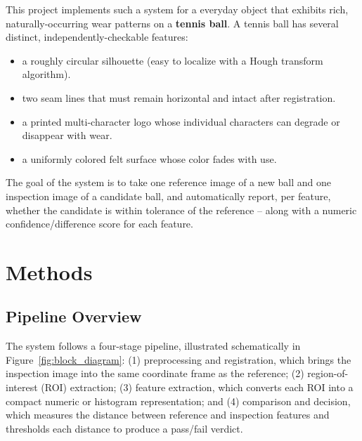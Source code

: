 \documentclass[11pt,a4paper]{article}
\begin{document}
This project implements such a system for a everyday object that exhibits
rich, naturally-occurring wear patterns on a \textbf{tennis ball}. A tennis
ball has several distinct, independently-checkable features:
\begin{itemize}[noitemsep]
    \item a roughly circular silhouette (easy to localize with a Hough
    transform algorithm).
    \item two seam lines that must remain horizontal and intact after
    registration.
    \item a printed multi-character logo whose individual characters can
    degrade or disappear with wear.
    \item a uniformly colored felt surface whose color fades with use.
\end{itemize}

The goal of the system is to take one reference image of a new ball and one
inspection image of a candidate ball, and automatically report, per
feature, whether the candidate is within tolerance of the reference --
along with a numeric confidence/difference score for each feature.

\section{Methods}

\subsection{Pipeline Overview}

The system follows a four-stage pipeline, illustrated schematically in
Figure~\ref{fig:block_diagram}: (1) preprocessing and registration, which
brings the inspection image into the same coordinate frame as the
reference; (2) region-of-interest (ROI) extraction; (3) feature extraction,
which converts each ROI into a compact numeric or histogram representation;
and (4) comparison and decision, which measures the distance between
reference and inspection features and thresholds each distance to produce a
pass/fail verdict.
\end{document}
